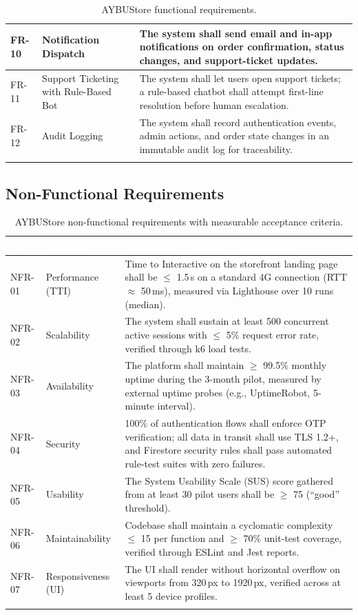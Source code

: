 \documentclass[11pt,a4paper]{article}
\begin{document}
\begin{longtable}{|p{}|p{}|p{}|}
FR-10 & Notification Dispatch & The system shall send email and in-app notifications on order confirmation, status changes, and support-ticket updates. \\ \hline
FR-11 & Support Ticketing with Rule-Based Bot & The system shall let users open support tickets; a rule-based chatbot shall attempt first-line resolution before human escalation. \\ \hline
FR-12 & Audit Logging & The system shall record authentication events, admin actions, and order state changes in an immutable audit log for traceability. \\ \hline
\caption{AYBUStore functional requirements.} \label{tab:fr} \\
\end{longtable}

\subsection{Non-Functional Requirements}
\begin{longtable}{|p{}|p{}|p{}|}
\hline
\rowcolor{aybuHeader}
\textcolor{white}{\textbf{ID}} &
\textcolor{white}{\textbf{Attribute}} &
\textcolor{white}{\textbf{Acceptance Criterion (Measurable)}} \\ \hline \endhead
NFR-01 & Performance (TTI) & Time to Interactive on the storefront landing page shall be $\leq$ 1.5\,s on a standard 4G connection (RTT $\approx$ 50\,ms), measured via Lighthouse over 10 runs (median). \\ \hline
NFR-02 & Scalability & The system shall sustain at least 500 concurrent active sessions with $\leq$ 5\% request error rate, verified through k6 load tests. \\ \hline
NFR-03 & Availability & The platform shall maintain $\geq$ 99.5\% monthly uptime during the 3-month pilot, measured by external uptime probes (e.g., UptimeRobot, 5-minute interval). \\ \hline
NFR-04 & Security & 100\% of authentication flows shall enforce OTP verification; all data in transit shall use TLS 1.2+, and Firestore security rules shall pass automated rule-test suites with zero failures. \\ \hline
NFR-05 & Usability & The System Usability Scale (SUS) score gathered from at least 30 pilot users shall be $\geq$ 75 (``good'' threshold). \\ \hline
NFR-06 & Maintainability & Codebase shall maintain a cyclomatic complexity $\leq$ 15 per function and $\geq$ 70\% unit-test coverage, verified through ESLint and Jest reports. \\ \hline
NFR-07 & Responsiveness (UI) & The UI shall render without horizontal overflow on viewports from 320\,px to 1920\,px, verified across at least 5 device profiles. \\ \hline
\caption{AYBUStore non-functional requirements with measurable acceptance criteria.} \label{tab:nfr} \\
\end{longtable}
\end{document}
